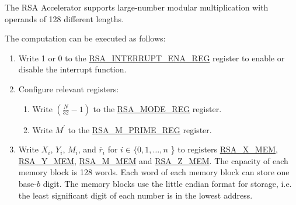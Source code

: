 \documentclass[main\_\_EN.tex]{subfiles}
\begin{document}
The RSA Accelerator supports large-number modular multiplication with operands of 128 different lengths.

The computation can be executed as follows:

\begin{enumerate}

    \item Write 1 or 0 to the \hyperref[regdesc:RSAINTERRUPTENAREG]{RSA\_INTERRUPT\_ENA\_REG} register to enable or disable the interrupt function.

    \item Configure relevant registers:

    \begin{enumerate}
        \item Write \begin{math}( \frac{N}{32} - 1 )\end{math} to the \hyperref[regdesc:RSAMODEREG]{RSA\_MODE\_REG} register.

        \item Write \begin{math}M^{\prime}\end{math} to the \hyperref[regdesc:RSAMPRIMEREG]{RSA\_M\_PRIME\_REG} register.

    \end{enumerate}

    \item Write
        \begin{math}X_{i}\end{math},
        \begin{math}Y_{i}\end{math},
        \begin{math}M_{i}\end{math}, and
        \begin{math}\overline{r}_{i}\end{math} for \begin{math}i \in \{ 0, 1, \dots, n \end{math} \} to registers \hyperref[regdesc:RSAmemory]{RSA\_X\_MEM}, \hyperref[regdesc:RSAmemory]{RSA\_Y\_MEM}, \hyperref[regdesc:RSAmemory]{RSA\_M\_MEM} and \hyperref[regdesc:RSAmemory]{RSA\_Z\_MEM}. The capacity of each memory block is 128 words. Each word of each memory block can store one base-\begin{math}b\end{math} digit. The memory blocks use the little endian format for storage, i.e. the least significant digit of each number is in the lowest address.


\end{enumerate}
\end{document}
